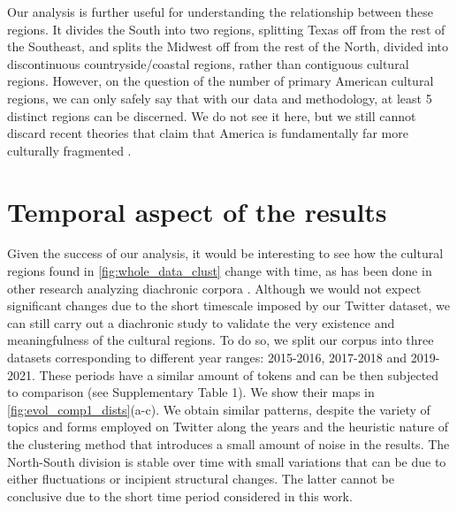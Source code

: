 \documentclass[../thesis.tex]{subfiles}
\begin{document}
Our analysis is further useful for understanding the relationship between these regions.
It divides the South into two regions, splitting Texas off from the rest of the
Southeast, and splits the Midwest off from the rest of the North, divided into
discontinuous countryside/coastal regions, rather than contiguous cultural regions.
However, on the question of the number of primary American cultural regions, we can only
safely say that with our data and methodology, at least 5 distinct regions can be
discerned. We do not see it here, but we still cannot discard recent theories that claim
that America is fundamentally far more culturally fragmented
\cite{GarreauNineNations1996,LieskeRegionalSubcultures1993,WoodardAmericanNations2012}.


\section{Temporal aspect of the results}
Given the success of our analysis, it would be interesting to see how the cultural
regions found in \cref{fig:whole_data_clust} change with time, as has been done in other
research analyzing diachronic corpora
\cite{BochkarevAverageWord2015,BentleyBooksAverage2014,KarjusQuantifyingDynamics2020,MomeniModelingEvolution2018,AlshaabiStorywranglerMassive2021}.
Although we would not expect significant changes due to the short timescale imposed by
our Twitter dataset, we can still carry out a diachronic study to validate the very
existence and meaningfulness of the cultural regions. To do so, we split our corpus into
three datasets corresponding to different year ranges: 2015-2016, 2017-2018 and
2019-2021. These periods have a similar amount of tokens and can be then subjected to
comparison (see Supplementary Table 1). We show their maps in
\cref{fig:evol_comp1_dists}(a-c). We obtain similar patterns, despite the variety of
topics and forms employed on Twitter along the years and the heuristic nature of the
clustering method that introduces a small amount of noise in the results. The
North-South division is stable over time with small variations that can be due to either
fluctuations or incipient structural changes. The latter cannot be conclusive due to the
short time period considered in this work.
\end{document}
